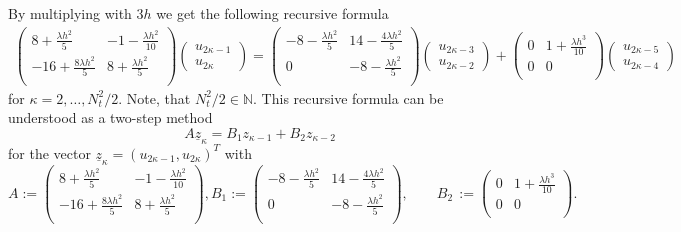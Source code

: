 \documentclass[a4paper,11pt]{article}
\newcommand{\N}{\mathbb N}
\renewcommand{\vec}[1]{\underline{#1}}
\begin{document}
By multiplying with $3h$ we get the following recursive formula
\begin{align*}
	\begin{pmatrix}
		{8}+\frac{\lambda h^2}{5}& -{1}-\frac{\lambda h^2}{10}\\
		{-16}+\frac{8\lambda h^2}{5}& {8}+\frac{\lambda h^2}{5}\\
	\end{pmatrix}
	\begin{pmatrix}
		u_{2\kappa-1}\\u_{2\kappa} 
	\end{pmatrix}
	=
	\begin{pmatrix}
		-{8}-\frac{\lambda h^2}{5}& {14}-\frac{4\lambda h^2}{5}\\
		0& -{8}-\frac{\lambda h^2}{5}\\
	\end{pmatrix}
	\begin{pmatrix}
		u_{2\kappa-3}\\u_{2\kappa-2} 
	\end{pmatrix}
	+
	\begin{pmatrix}
		0& {1}+\frac{\lambda h^3}{10}\\
		0&0\\
	\end{pmatrix}
	\begin{pmatrix}
		u_{2\kappa-5}\\u_{2\kappa-4} 
	\end{pmatrix}
\end{align*}
for $\kappa=2,\dots, N_t^2/2$. Note, that $N_t^2/2\in\N$.
This recursive formula can be understood as a two-step method 
\begin{equation*}
	A\vec z_\kappa =
	B_1 z_{\kappa-1}+ B_2 z_{\kappa-2}
\end{equation*}
for the vector $\vec z_\kappa = (u_{2\kappa-1},u_{2\kappa} )^T$ with 
\begin{subequations}
	\begin{equation*}
		A :=\begin{pmatrix}
			{8}+\frac{\lambda h^2}{5}& -{1}-\frac{\lambda h^2}{10}\\
			{-16}+\frac{8\lambda h^2}{5}& {8}+\frac{\lambda h^2}{5}\\
		\end{pmatrix}, 
	\end{equation*}
	\begin{equation*}	
		B_1 := \begin{pmatrix}
			-{8}-\frac{\lambda h^2}{5}& {14}-\frac{4\lambda h^2}{5}\\
			0& -{8}-\frac{\lambda h^2}{5}\\
		\end{pmatrix},\qquad 
		B_2 \, := \begin{pmatrix}
			0& {1}+\frac{\lambda h^3}{10}\\
			0&0\\
		\end{pmatrix}.
	\end{equation*}
\end{subequations} 
\end{document}
